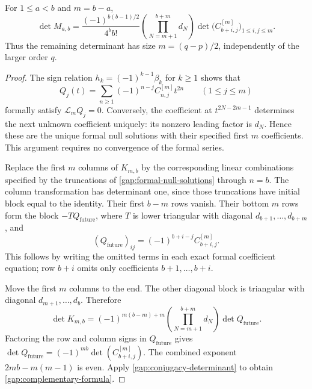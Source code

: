 \begin{theorem}
\label{gap:complementary}
For $1\le a<b$ and $m=b-a$,
\begin{equation}\label{gap:complementary-formula}
 \det M_{a,b}
 =\frac{(-1)^{b(b-1)/2}}{4^bb!}
 \left(\prod_{N=m+1}^{b+m}d_N\right)
 \det\bigl(C_{b+i,j}^{[m]}\bigr)_{1\le i,j\le m}.
\end{equation}
Thus the remaining determinant has size $m=(q-p)/2$, independently
of the larger order $q$.
\end{theorem}

\begin{proof}
The sign relation $h_k=(-1)^{k-1}\beta_k$ for $k\ge1$ shows that
\begin{equation}\label{gap:formal-null-solutions}
 Q_j(t)=\sum_{n\ge1}(-1)^{n-j}C_{n,j}^{[m]}t^{2n}
 \qquad(1\le j\le m)
\end{equation}
formally satisfy $\mathcal L_mQ_j=0$. Conversely, the coefficient
at $t^{2N-2m-1}$ determines the next unknown coefficient uniquely:
its nonzero leading factor is $d_N$. Hence these are the unique
formal null solutions with their specified first $m$ coefficients.
This argument requires no convergence of the formal series.

Replace the first $m$ columns of $K_{m,b}$ by the corresponding
linear combinations specified by the truncations of
\eqref{gap:formal-null-solutions} through $n=b$. The column
transformation has determinant one, since those truncations have
initial block equal to the identity. Their first $b-m$ rows vanish.
Their bottom $m$ rows form the block $-TQ_{\mathrm{future}}$, where
$T$ is lower triangular with diagonal $d_{b+1},\ldots,d_{b+m}$,
and
\[
 (Q_{\mathrm{future}})_{ij}
      =(-1)^{b+i-j}C_{b+i,j}^{[m]}.
\]
This follows by writing the omitted terms in each exact formal
coefficient equation; row $b+i$ omits only coefficients
$b+1,\ldots,b+i$.

Move the first $m$ columns to the end. The other diagonal block is
triangular with diagonal $d_{m+1},\ldots,d_b$. Therefore
\[
 \det K_{m,b}
 =(-1)^{m(b-m)+m}\left(\prod_{N=m+1}^{b+m}d_N\right)
                          \det Q_{\mathrm{future}}.
\]
Factoring the row and column signs in $Q_{\mathrm{future}}$
gives $\det Q_{\mathrm{future}}=(-1)^{mb}
\det(C_{b+i,j}^{[m]})$. The combined exponent
$2mb-m(m-1)$ is even. Apply
\eqref{gap:conjugacy-determinant} to obtain
\eqref{gap:complementary-formula}.
\end{proof}

